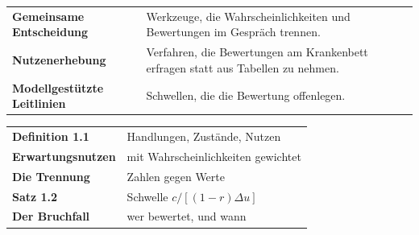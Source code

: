\begin{forschung}
\begin{center}
{\small
\renewcommand{\arraystretch}{1.45}
\begin{tabular}{@{}P{3.0cm}P{5.2cm}@{}}
\toprule
\textbf{Gemeinsame Entscheidung} & Werkzeuge, die Wahrscheinlichkeiten und Bewertungen im Gespräch trennen.\\
\textbf{Nutzenerhebung} & Verfahren, die Bewertungen am Krankenbett erfragen statt aus Tabellen zu nehmen.\\
\textbf{Modellgestützte Leitlinien} & Schwellen, die die Bewertung offenlegen.\\
\bottomrule
\end{tabular}}
\end{center}

\begin{center}
\begin{minipage}{0.88\textwidth}
\end{minipage}
\end{center}
\end{forschung}

\begin{merksatz}
\begin{center}
\renewcommand{\arraystretch}{1.5}
\begin{tabular}{@{}P{3.0cm}P{5.6cm}@{}}
\toprule
\textbf{Definition 1.1} & Handlungen, Zustände, Nutzen\\
\textbf{Erwartungs\-nutzen} & mit Wahrscheinlichkeiten gewichtet\\
\textbf{Die Trennung} & Zahlen gegen Werte\\
\textbf{Satz 1.2} & Schwelle $c/[(1-r)\Delta u]$\\
\textbf{Der Bruchfall} & wer bewertet, und wann\\
\bottomrule
\end{tabular}
\end{center}

\begin{center}
\begin{minipage}{0.88\textwidth}
\end{minipage}
\end{center}
\end{merksatz}
